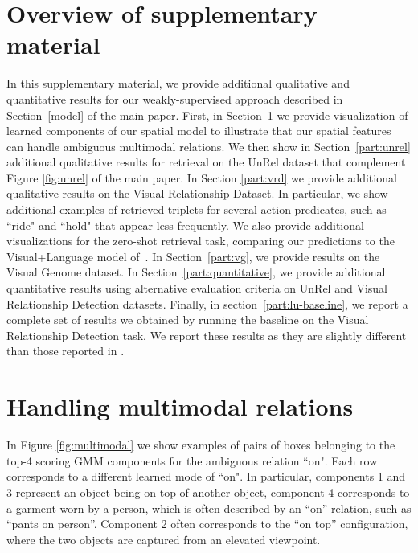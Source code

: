\documentclass[10pt,twocolumn,letterpaper]{article}
\begin{document}
{\small


}




\clearpage

\appendix



\section*{Overview of supplementary material}
In this supplementary material, we provide additional qualitative and quantitative results for our weakly-supervised approach described in Section~\ref{model} of the main paper. First, in Section~\ref{part:multimodal} we provide visualization of learned components of our spatial model to illustrate that our spatial features can handle ambiguous multimodal relations. We then show in Section~\ref{part:unrel} additional qualitative results for retrieval on the UnRel dataset that complement Figure \ref{fig:unrel} of the main paper. In Section \ref{part:vrd} we provide additional qualitative results on the Visual Relationship Dataset. In particular, we show additional examples of retrieved triplets for several action predicates, such as ``ride" and ``hold" that appear less frequently. We also provide additional visualizations for the zero-shot retrieval task, comparing our predictions to the Visual+Language model of~\cite{Lu16}. In Section~\ref{part:vg}, we provide results on the Visual Genome dataset. In Section~\ref{part:quantitative}, we provide additional quantitative results using alternative evaluation criteria  on UnRel and Visual Relationship Detection datasets. 
Finally, in section~\ref{part:lu-baseline}, we report a complete set of results we obtained by running the baseline \cite{Lu16} on the Visual Relationship Detection task. We report these results as they are slightly different than those reported in \cite{Lu16}.



\section{Handling multimodal relations}
\label{part:multimodal}
In Figure \ref{fig:multimodal} we show examples of pairs of boxes belonging to the top-4 scoring GMM components for the ambiguous relation ``on". Each row corresponds to a different learned mode of ``on". In particular, components 1 and 3 represent an object being on top of another object, component 4 corresponds to a garment worn by a person, which is often described by an ``on'' relation, such as ``pants on person''. Component 2 often corresponds to the ``on top'' configuration, where the two objects are captured from an elevated viewpoint. 
\end{document}

